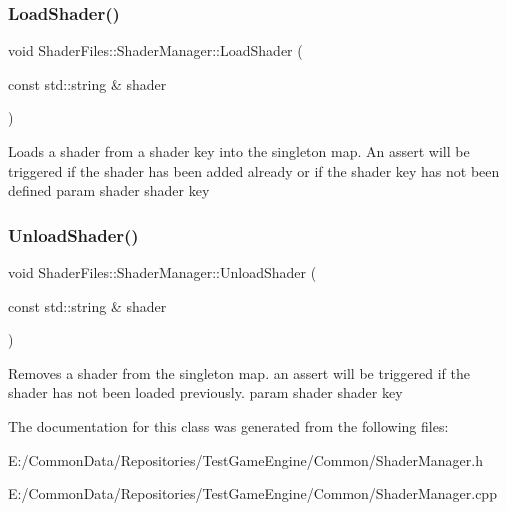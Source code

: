 \subsubsection{\texorpdfstring{LoadShader()}{LoadShader()}}
{\footnotesize\ttfamily void Shader\+Files\+::\+Shader\+Manager\+::\+Load\+Shader (\begin{DoxyParamCaption}\item[{const std\+::string \&}]{shader }\end{DoxyParamCaption})}

Loads a shader from a shader key into the singleton map. An assert will be triggered if the shader has been added already or if the shader key has not been defined param shader shader key \mbox{\label{class_shader_files_1_1_shader_manager_a58fa6395429ed76613b1c70dec844c09}} 
\subsubsection{\texorpdfstring{UnloadShader()}{UnloadShader()}}
{\footnotesize\ttfamily void Shader\+Files\+::\+Shader\+Manager\+::\+Unload\+Shader (\begin{DoxyParamCaption}\item[{const std\+::string \&}]{shader }\end{DoxyParamCaption})}

Removes a shader from the singleton map. an assert will be triggered if the shader has not been loaded previously. param shader shader key 

The documentation for this class was generated from the following files\+:\begin{DoxyCompactItemize}
\item 
E\+:/\+Common\+Data/\+Repositories/\+Test\+Game\+Engine/\+Common/Shader\+Manager.\+h\item 
E\+:/\+Common\+Data/\+Repositories/\+Test\+Game\+Engine/\+Common/Shader\+Manager.\+cpp\end{DoxyCompactItemize}
